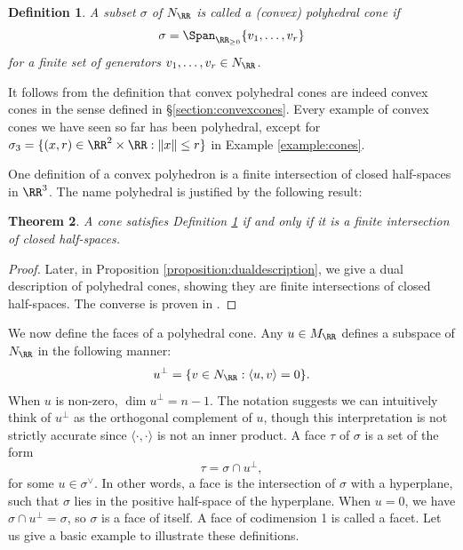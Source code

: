 \documentclass[12pt]{amsart}
\theoremstyle{plain}
\newtheorem{theorem}{Theorem}[subsection]
\newtheorem{definition}[theorem]{Definition}
\theoremstyle{definition}
\begin{document}
\begin{definition}\label{definition:convexpolyhedral}
A subset $\sigma$ of $N_\RR$ is called a (convex) polyhedral cone if
$$\sigma = \Span_{\RR_{\ge 0}} \{v_1, \ldots, v_r\}$$
for a finite set of generators $v_1, \ldots, v_r \in N_\RR$.
\end{definition}

It follows from the definition that convex polyhedral cones are indeed convex cones in the sense defined in \S \ref{section:convexcones}.
Every example of convex cones we have seen so far has been polyhedral, except for $\sigma_3 = \{(x, r) \in \RR^2 \times \RR : \|x\| \le r\}$ in Example \ref{example:cones}.

One definition of a convex polyhedron is a finite intersection of closed half-spaces in $\RR^3$.
The name polyhedral is justified by the following result:

\begin{theorem}
A cone satisfies Definition \ref{definition:convexpolyhedral} if and only if it is a finite intersection of closed half-spaces.
\end{theorem}
\begin{proof}
Later, in Proposition \ref{proposition:dualdescription}, we give a dual description of polyhedral cones, showing they are finite intersections of closed half-spaces.
The converse is proven in \cite[1.3.13]{DLHK13}.
\end{proof}

We now define the faces of a polyhedral cone.
Any $u \in M_\RR$ defines a subspace of $N_\RR$ in the following manner:
$$u^\perp = \{v \in N_\RR : \langle u, v \rangle = 0\}.$$
When $u$ is non-zero, $\dim u^\perp = n -1$.
The notation suggests we can intuitively think of $u^\perp$ as the orthogonal complement of $u$, though this interpretation is not strictly accurate since $\langle \cdot, \cdot \rangle$ is not an inner product.
A face $\tau$ of $\sigma$ is a set of the form 
$$\tau = \sigma \cap u^\perp,$$
for some $u \in \sigma^\vee$.
In other words, a face is the intersection of $\sigma$ with a hyperplane, such that $\sigma$ lies in the positive half-space of the hyperplane.
When $u = 0$, we have $\sigma \cap u^\perp = \sigma$, so $\sigma$ is a face of itself.
A face of codimension 1 is called a facet.
Let us give a basic example to illustrate these definitions.
\end{document}
